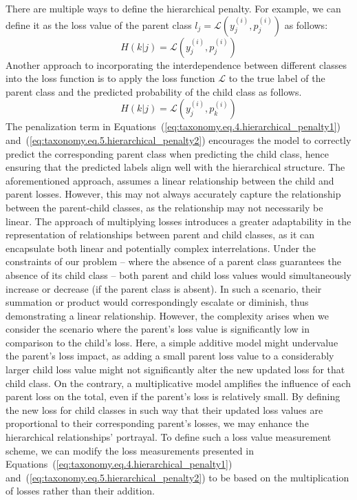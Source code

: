 \documentclass[authoryear,preprint,review,12pt]{elsarticle}
\begin{document}
There are multiple ways to define the hierarchical penalty. For example, we can define it as the loss value of the parent class $l_j=\mathcal{L} \left(y_j^{(i)},p_j^{(i)}\right) $ as follows:
\begin{equation}
    H(k \vert j)=\mathcal{L} \left(y_j^{(i)},p_j^{(i)}\right)
    \label{eq:taxonomy.eq.4.hierarchical_penalty1}
\end{equation}
Another approach to incorporating the interdependence between different classes into the loss function is to apply the loss function $\mathcal{L} $ to the true label of the parent class and the predicted probability of the child class as follows.
\begin{equation}
    H(k\vert j)  = \mathcal{L} \left(y_j^{(i)},p_k^{(i)}\right)
    \label{eq:taxonomy.eq.5.hierarchical_penalty2}
\end{equation}
The penalization term in Equations~(\ref{eq:taxonomy.eq.4.hierarchical_penalty1}) and~(\ref{eq:taxonomy.eq.5.hierarchical_penalty2}) encourages the model to correctly predict the corresponding parent class when predicting the child class, hence ensuring that the predicted labels  align well with the hierarchical structure. The aforementioned approach, assumes a linear relationship  between the child and parent losses. However, this may not always accurately capture the relationship between the parent-child classes, as the relationship may not necessarily be linear.
The approach of multiplying losses introduces a greater adaptability in the representation of relationships between parent and child classes, as it can encapsulate both linear and potentially complex interrelations. Under the constraints of our problem -- where the absence of a parent class guarantees the absence of its child class -- both parent and child loss values would simultaneously increase or decrease (if the parent class is absent). In such a scenario, their summation or product would correspondingly escalate or diminish, thus demonstrating a linear relationship.
However, the complexity arises when we consider the scenario where the parent's loss value is significantly low in comparison to the child's loss. Here, a simple additive model might undervalue the parent's loss impact, as adding a small parent loss value to a considerably larger child loss value might not significantly alter the new updated loss for that child class. On the contrary, a multiplicative model amplifies the influence of each parent loss on the total, even if the parent's loss is relatively small. By defining the new loss for child classes in such way that their updated loss values are proportional to their corresponding parent's losses, we may enhance the hierarchical relationships' portrayal. To define such a loss value measurement scheme, we can modify the loss measurements presented in Equations~(\ref{eq:taxonomy.eq.4.hierarchical_penalty1}) and~(\ref{eq:taxonomy.eq.5.hierarchical_penalty2}) to be based on the multiplication of losses rather than their addition.
\end{document}
